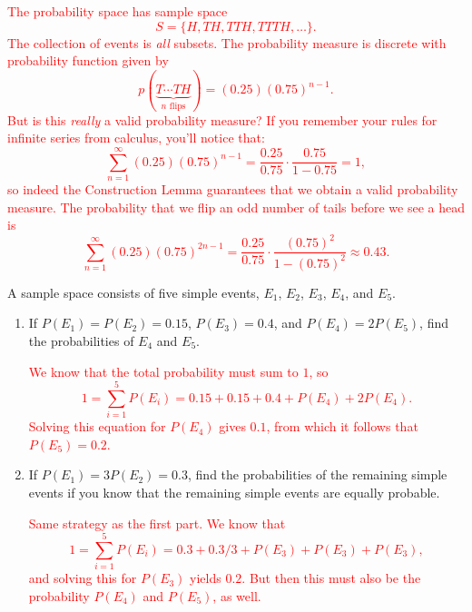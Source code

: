 \documentclass[12pt,reqno]{amsart}
\begin{document}
\begin{enumerate}
\bigskip
\textcolor{red}{The probability space has sample space
	\[
	S = \{ H, TH, TTH, TTTH, \ldots\}.
	\]
The collection of events is \textit{all} subsets. The probability measure is discrete with probability function given by
	\[
	p(\underbrace{T\cdots TH}_{\text{$n$ flips}}) = (0.25)(0.75)^{n-1}.
	\]
But is this \textit{really} a valid probability measure? If you remember your rules for infinite series from calculus, you'll notice that:
	\[
	\sum_{n=1}^\infty (0.25)(0.75)^{n-1} = \frac{0.25}{0.75} \cdot \frac{0.75}{1-0.75} = 1,
	\]
so indeed the Construction Lemma guarantees that we obtain a valid probability measure. The probability that we flip an odd number of tails before we see a head is
	\[
	\sum_{n=1}^\infty (0.25)(0.75)^{2n-1} = \frac{0.25}{0.75} \cdot \frac{(0.75)^2}{1-(0.75)^2} \approx 0.43.
	\]}
\end{enumerate}

















\bigskip
\prob A sample space consists of five simple events, $E_1$, $E_2$, $E_3$, $E_4$, and $E_5$.

\medskip
\begin{enumerate}
\item If $P(E_1) = P(E_2) = 0.15$, $P(E_3) = 0.4$, and $P(E_4) = 2P(E_5)$, find the probabilities of $E_4$ and $E_5$.
    
\bigskip
\textcolor{red}{We know that the total probability must sum to $1$, so
	\[
	1 = \sum_{i=1}^5P(E_i) = 0.15 + 0.15 + 0.4 + P(E_4) + 2P(E_4).
	\]
Solving this equation for $P(E_4)$ gives $0.1$, from which it follows that $P(E_5)=0.2$.}
\bigskip

\item If $P(E_1) = 3P(E_2) = 0.3$, find the probabilities of the remaining simple events if you know that the remaining simple events are equally probable.
    
\bigskip
\textcolor{red}{Same strategy as the first part. We know that
	\[
	1 = \sum_{i=1}^5P(E_i) = 0.3 + 0.3/3 + P(E_3) + P(E_3) + P(E_3),
	\]
and solving this for $P(E_3)$ yields $0.2$. But then this must also be the probability $P(E_4)$ and $P(E_5)$, as well.}
    
\end{enumerate}
\end{document}
